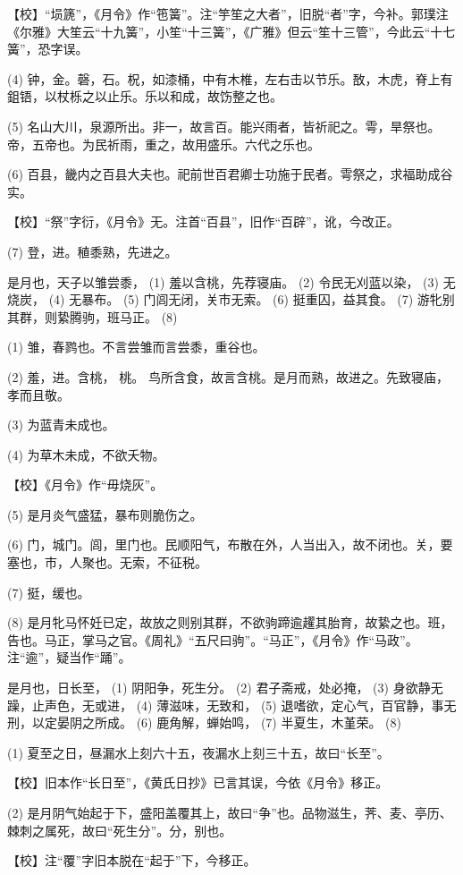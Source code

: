 \documentclass[12pt,UTF8]{ctexbook}
\begin{document}
【校】“埙篪”，《月令》作“竾簧”。注“竽笙之大者”，旧脱“者”字，今补。郭璞注《尔雅》大笙云“十九簧”，小笙“十三簧”，《广雅》但云“笙十三管”，今此云“十七簧”，恐字误。

(4) 钟，金。磬，石。柷，如漆桶，中有木椎，左右击以节乐。敔，木虎，脊上有鉏铻，以杖栎之以止乐。乐以和成，故饬整之也。

(5) 名山大川，泉源所出。非一，故言百。能兴雨者，皆祈祀之。雩，旱祭也。帝，五帝也。为民祈雨，重之，故用盛乐。六代之乐也。

(6) 百县，畿内之百县大夫也。祀前世百君卿士功施于民者。雩祭之，求福助成谷实。

【校】“祭”字衍，《月令》无。注首“百县”，旧作“百辟”，讹，今改正。

(7) 登，进。稙黍熟，先进之。

是月也，天子以雏尝黍， (1) 羞以含桃，先荐寝庙。 (2) 令民无刈蓝以染， (3) 无烧炭， (4) 无暴布。 (5) 门闾无闭，关市无索。 (6) 挺重囚，益其食。 (7) 游牝别其群，则絷腾驹，班马正。 (8)

(1) 雏，春鹨也。不言尝雏而言尝黍，重谷也。

(2) 羞，进。含桃， 桃。 鸟所含食，故言含桃。是月而熟，故进之。先致寝庙，孝而且敬。

(3) 为蓝青未成也。

(4) 为草木未成，不欲夭物。

【校】《月令》作“毋烧灰”。

(5) 是月炎气盛猛，暴布则脆伤之。

(6) 门，城门。闾，里门也。民顺阳气，布散在外，人当出入，故不闭也。关，要塞也，市，人聚也。无索，不征税。

(7) 挺，缓也。

(8) 是月牝马怀妊已定，故放之则别其群，不欲驹蹄逾趯其胎育，故絷之也。班，告也。马正，掌马之官。《周礼》“五尺曰驹”。“马正”，《月令》作“马政”。注“逾”，疑当作“踊”。

是月也，日长至， (1) 阴阳争，死生分。 (2) 君子斋戒，处必掩， (3) 身欲静无躁，止声色，无或进， (4) 薄滋味，无致和， (5) 退嗜欲，定心气，百官静，事无刑，以定晏阴之所成。 (6) 鹿角解，蝉始鸣， (7) 半夏生，木堇荣。 (8)

(1) 夏至之日，昼漏水上刻六十五，夜漏水上刻三十五，故曰“长至”。

【校】旧本作“长日至”，《黄氏日抄》已言其误，今依《月令》移正。

(2) 是月阴气始起于下，盛阳盖覆其上，故曰“争”也。品物滋生，荠、麦、亭历、棘刺之属死，故曰“死生分”。分，别也。

【校】注“覆”字旧本脱在“起于”下，今移正。
\end{document}
